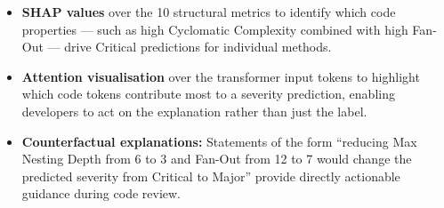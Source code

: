 \documentclass[12pt, a4paper]{report}
\begin{document}
\begin{itemize}
  \item \textbf{SHAP values} over the 10 structural metrics to identify which
  code properties --- such as high Cyclomatic Complexity combined with high
  Fan-Out --- drive Critical predictions for individual methods.
  \item \textbf{Attention visualisation} over the transformer input tokens to
  highlight which code tokens contribute most to a severity prediction,
  enabling developers to act on the explanation rather than just the label.
  \item \textbf{Counterfactual explanations:} Statements of the form
  ``reducing Max Nesting Depth from 6 to 3 and Fan-Out from 12 to 7 would
  change the predicted severity from Critical to Major'' provide directly
  actionable guidance during code review.
\end{itemize}
\end{document}
